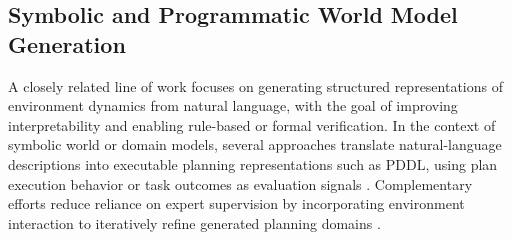 \subsection{Symbolic and Programmatic World Model Generation}


A closely related line of work focuses on generating structured representations of environment dynamics from natural language, with the goal of improving interpretability and enabling rule-based or formal verification. In the context of symbolic world or domain models, several approaches translate natural-language descriptions into executable planning representations such as PDDL, using plan execution behavior or task outcomes as evaluation signals \cite{hu2025text2world,zhang2024open_domain_planning_repr,oswald2024llm_planning_domain_generators}. Complementary efforts reduce reliance on expert supervision by incorporating environment interaction to iteratively refine generated planning domains \cite{mahdavi2024pddl_interaction}.



